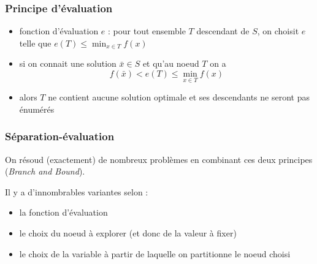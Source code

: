 \documentclass{beamer}
\begin{document}
\begin{frame}
  \frametitle{Principe d'évaluation}

  \begin{itemize}
  \item fonction d'évaluation $e$ : pour tout ensemble $T$ descendant de $S$,
    on choisit $e$ telle que $e(T) \leq \min_{x \in T} f(x)$
  \item si on connait une solution $\bar{x} \in S$ et qu'au noeud $T$ on a
    \[f(\bar{x}) < e(T) \leq \min_{x \in T} f(x) \]
  \item alors $T$ ne contient aucune solution optimale et ses descendants
    ne seront pas énumérés
  \end{itemize}
  
\end{frame}

\begin{frame}
  \frametitle{Séparation-évaluation}

  On résoud (exactement) de nombreux problèmes en combinant ces deux principes
  (\emph{Branch and Bound}).

  Il y a d'innombrables variantes selon :
  \begin{itemize}
  \item la fonction d'évaluation
  \item le choix du noeud à explorer (et donc de la valeur à fixer)
  \item le choix de la variable à partir de laquelle on partitionne le noeud choisi
  \end{itemize}

  
\end{frame}
\end{document}
